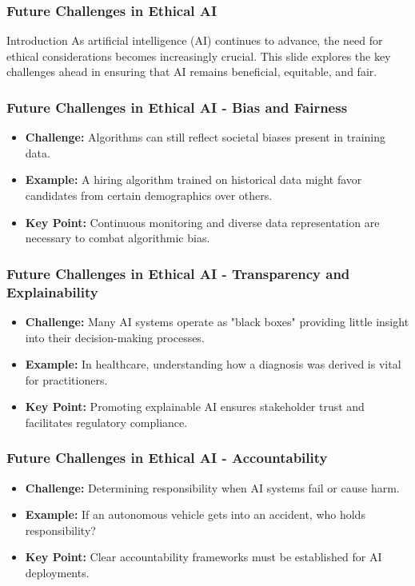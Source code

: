 \documentclass{beamer}
\begin{document}
\begin{frame}[fragile]
    \frametitle{Future Challenges in Ethical AI}
    \begin{block}{Introduction}
        As artificial intelligence (AI) continues to advance, the need for ethical considerations becomes increasingly crucial. 
        This slide explores the key challenges ahead in ensuring that AI remains beneficial, equitable, and fair.
    \end{block}
\end{frame}

\begin{frame}[fragile]
    \frametitle{Future Challenges in Ethical AI - Bias and Fairness}
    \begin{itemize}
        \item \textbf{Challenge:} Algorithms can still reflect societal biases present in training data.
        \item \textbf{Example:} A hiring algorithm trained on historical data might favor candidates from certain demographics over others.
        \item \textbf{Key Point:} Continuous monitoring and diverse data representation are necessary to combat algorithmic bias.
    \end{itemize}
\end{frame}

\begin{frame}[fragile]
    \frametitle{Future Challenges in Ethical AI - Transparency and Explainability}
    \begin{itemize}
        \item \textbf{Challenge:} Many AI systems operate as "black boxes" providing little insight into their decision-making processes.
        \item \textbf{Example:} In healthcare, understanding how a diagnosis was derived is vital for practitioners.
        \item \textbf{Key Point:} Promoting explainable AI ensures stakeholder trust and facilitates regulatory compliance.
    \end{itemize}
\end{frame}

\begin{frame}[fragile]
    \frametitle{Future Challenges in Ethical AI - Accountability}
    \begin{itemize}
        \item \textbf{Challenge:} Determining responsibility when AI systems fail or cause harm.
        \item \textbf{Example:} If an autonomous vehicle gets into an accident, who holds responsibility?
        \item \textbf{Key Point:} Clear accountability frameworks must be established for AI deployments.
    \end{itemize}
\end{frame}
\end{document}
